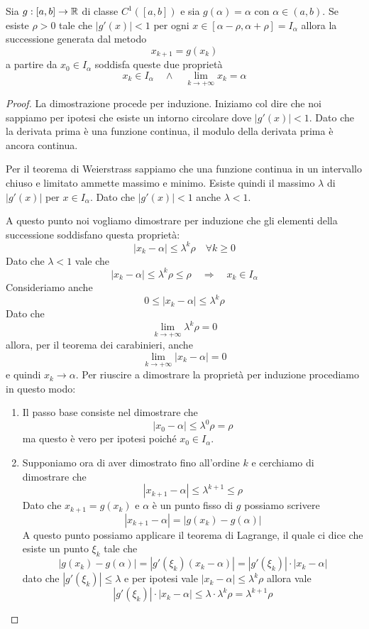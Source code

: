 \begin{theorem}\label{th: punto_fisso}
	Sia $g : [a, b] \to \mathbb{R}$ di classe $C^1 ([a, b])$ e sia $g(\alpha) = \alpha$ con $\alpha \in (a,b)$. Se esiste
	$\rho > 0$ tale che $|g'(x)| < 1$ per ogni $x \in [\alpha - \rho, \alpha + \rho] = I_\alpha$ allora la
	successione generata dal metodo
	\[ x_{k+1} = g(x_k) \]
	a partire da $x_0 \in I_\alpha$ soddisfa queste due proprietà
	\[ x_k \in I_\alpha \quad \wedge \quad \lim_{k \to +\infty} x_k = \alpha \]
	\begin{proof}
		La dimostrazione procede per induzione. Iniziamo col dire che noi sappiamo per ipotesi che esiste un
		intorno circolare dove $|g'(x)| < 1$. Dato che la derivata prima è una funzione continua, il modulo
		della derivata prima è ancora continua.

		Per il teorema di Weierstrass sappiamo che una funzione continua in un intervallo chiuso e limitato
		ammette massimo e minimo. Esiste quindi il massimo $\lambda$ di $|g'(x)|$ per $x \in I_\alpha$.
		Dato che $|g'(x)| < 1$ anche $\lambda < 1$.

		A questo punto noi vogliamo dimostrare per induzione che gli elementi della successione soddisfano
		questa proprietà:
		\[ |x_k - \alpha| \leq \lambda^k \rho \quad \forall k \geq 0 \]
		Dato che $\lambda < 1$ vale che
		\[ |x_k - \alpha| \leq \lambda^k \rho \leq \rho \quad \Rightarrow \quad x_k \in I_\alpha \]
		Consideriamo anche
		\[ 0 \leq |x_k - \alpha| \leq \lambda^k \rho \]
		Dato che
		\[ \lim_{k \to +\infty} \lambda^k \rho = 0\]
		allora, per il teorema dei carabinieri, anche
		\[ \lim_{k \to +\infty} |x_k - \alpha| = 0 \]
		e quindi $x_k \to \alpha$. Per riuscire a dimostrare la proprietà per induzione procediamo in questo modo:
		\begin{enumerate}
			\item Il passo base consiste nel dimostrare che
			      \[ |x_0 - \alpha| \leq \lambda^0 \rho = \rho \]
			      ma questo è vero per ipotesi poiché $x_0 \in I_\alpha$.
			\item Supponiamo ora di aver dimostrato fino all'ordine $k$ e cerchiamo di dimostrare che
			      \[ |x_{k+1} - \alpha| \leq \lambda^{k+1} \leq \rho \]
			      Dato che $x_{k+1} = g(x_k)$ e $\alpha$ è un punto fisso di $g$ possiamo scrivere
			      \[ |x_{k+1} - \alpha| = |g(x_k) - g(\alpha)| \]
			      A questo punto possiamo applicare il teorema di Lagrange, il quale ci dice che esiste un punto
			      $\xi_k$ tale che
			      \[ |g(x_k) - g(\alpha)| = |g'(\xi_k) (x_k - \alpha)| = |g'(\xi_k)| \cdot |x_k - \alpha| \]
			      dato che $|g'(\xi_k)| \leq \lambda$ e per ipotesi vale $|x_k - \alpha| \leq \lambda^k \rho$
			      allora vale
			      \[ |g'(\xi_k)| \cdot |x_k - \alpha| \leq \lambda \cdot \lambda^k \rho = \lambda^{k+1} \rho \]
		\end{enumerate}
	\end{proof}
\end{theorem}


